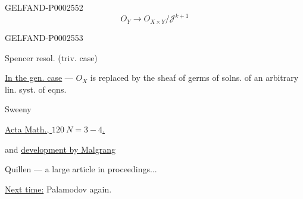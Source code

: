 \begin{GelfandAdjacentEvidence}{GELFAND-P000255}{2}
\begin{equation*}
O_Y\longrightarrow O_{X\times Y}/\mathcal J^{k+1}
\end{equation*}

\end{GelfandAdjacentEvidence}
\begin{GelfandAdjacentEvidence}{GELFAND-P000255}{3}


\end{GelfandAdjacentEvidence}


Spencer resol. (triv. case)





\underline{\underline{In the gen. case}} — $O_X$ is replaced by the sheaf of germs of solns. of an arbitrary lin. syst. of eqns.





Sweeny

\underline{Acta Math., $120\ N=3-4$.}

and \underline{development by Malgrang}





Quillen — a large article in proceedings...

\underline{Next time:} Palamodov again.





\begin{flushright}
\end{flushright}







